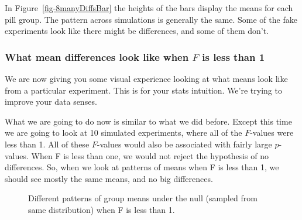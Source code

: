 \documentclass[
  letterpaper,
  DIV=11,
  numbers=noendperiod]{scrreprt}
\begin{document}
In Figure~\ref{fig-8manyDiffsBar} the heights of the bars display the
means for each pill group. The pattern across simulations is generally
the same. Some of the fake experiments look like there might be
differences, and some of them don't.

\subsubsection{\texorpdfstring{What mean differences look like when
\(F\) is less than
1}{What mean differences look like when F is less than 1}}\label{what-mean-differences-look-like-when-f-is-less-than-1}

We are now giving you some visual experience looking at what means look
like from a particular experiment. This is for your stats intuition.
We're trying to improve your data senses.

What we are going to do now is similar to what we did before. Except
this time we are going to look at 10 simulated experiments, where all of
the \(F\)-values were less than 1. All of these \(F\)-values would also
be associated with fairly large \(p\)-values. When F is less than one,
we would not reject the hypothesis of no differences. So, when we look
at patterns of means when F is less than 1, we should see mostly the
same means, and no big differences.

\begin{figure}


\caption{\label{fig-8flesshthanone}Different patterns of group means
under the null (sampled from same distribution) when F is less than 1.}

\end{figure}%
\end{document}
